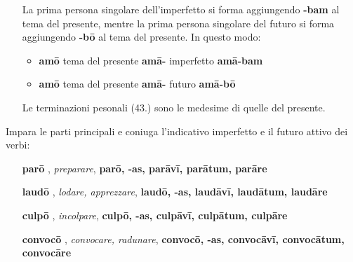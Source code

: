 \documentclass[nols]{tufte-handout}
\newcommand{\textls}[2][5]{%
    \begingroup\addfontfeatures{LetterSpace=#1}#2\endgroup
  }
\renewcommand{\smallcapsspacing}[1]{\textls[10]{#1}}
\renewcommand{\textsc}[1]{\smallcapsspacing{\textsmallcaps{#1}}}
\begin{document}
\begin{itemize}
\item[\textsc{1.}] La prima persona singolare dell'imperfetto si forma aggiungendo \textbf{-bam} al tema del presente, 
mentre la prima persona singolare del futuro si forma aggiungendo \textbf{-bō} al tema del presente. In questo modo:
	\begin{itemize}
		\item \textbf{amō}	\quad tema del presente \textbf{amā-}	\quad	imperfetto  \textbf{amā-bam}
		\item \textbf{amō}	\quad tema del presente \textbf{amā-}	\quad	futuro  \textbf{amā-bō}
	\end{itemize}
\item[\textsc{2.}] Le terminazioni pesonali (43.) sono le medesime di quelle del presente. 
\end{itemize}

 Impara le parti principali e coniuga l'indicativo imperfetto e il futuro attivo dei verbi:

\begin{itemize}
\item[\textbf{parō}], \textit{preparare}, \textbf{parō, -as, parāvī, parātum, parāre}
\item[\textbf{laudō}], \textit{lodare, apprezzare}, \textbf{laudō, -as, laudāvī, laudātum, laudāre}
\item[\textbf{culpō}], \textit{incolpare}, \textbf{culpō, -as, culpāvī, culpātum, culpāre}
\item[\textbf{convocō}], \textit{convocare, radunare}, \textbf{convocō, -as, convocāvī, convocātum, convocāre}
\end{itemize}


\end{document}
